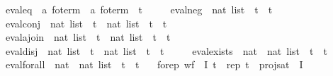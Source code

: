 \begin{isabellebody}
\ \ \ \ \ eval{\isacharunderscore}{\kern0pt}eq\ {\isacharcolon}{\kern0pt}{\isacharcolon}{\kern0pt}\ {\isachardoublequoteopen}{\isacharprime}{\kern0pt}a\ fo{\isacharunderscore}{\kern0pt}term\ {\isasymRightarrow}\ {\isacharprime}{\kern0pt}a\ fo{\isacharunderscore}{\kern0pt}term\ {\isasymRightarrow}\ {\isacharprime}{\kern0pt}t{\isachardoublequoteclose}\isanewline
\ \ \ \ \ eval{\isacharunderscore}{\kern0pt}neg\ {\isacharcolon}{\kern0pt}{\isacharcolon}{\kern0pt}\ {\isachardoublequoteopen}nat\ list\ {\isasymRightarrow}\ {\isacharprime}{\kern0pt}t\ {\isasymRightarrow}\ {\isacharprime}{\kern0pt}t{\isachardoublequoteclose}\isanewline
\ \ \ \ \ eval{\isacharunderscore}{\kern0pt}conj\ {\isacharcolon}{\kern0pt}{\isacharcolon}{\kern0pt}\ {\isachardoublequoteopen}nat\ list\ {\isasymRightarrow}\ {\isacharprime}{\kern0pt}t\ {\isasymRightarrow}\ nat\ list\ {\isasymRightarrow}\ {\isacharprime}{\kern0pt}t\ {\isasymRightarrow}\ {\isacharprime}{\kern0pt}t{\isachardoublequoteclose}\isanewline
\ \ \ \ \ eval{\isacharunderscore}{\kern0pt}ajoin\ {\isacharcolon}{\kern0pt}{\isacharcolon}{\kern0pt}\ {\isachardoublequoteopen}nat\ list\ {\isasymRightarrow}\ {\isacharprime}{\kern0pt}t\ {\isasymRightarrow}\ nat\ list\ {\isasymRightarrow}\ {\isacharprime}{\kern0pt}t\ {\isasymRightarrow}\ {\isacharprime}{\kern0pt}t{\isachardoublequoteclose}\isanewline
\ \ \ \ \ eval{\isacharunderscore}{\kern0pt}disj\ {\isacharcolon}{\kern0pt}{\isacharcolon}{\kern0pt}\ {\isachardoublequoteopen}nat\ list\ {\isasymRightarrow}\ {\isacharprime}{\kern0pt}t\ {\isasymRightarrow}\ nat\ list\ {\isasymRightarrow}\ {\isacharprime}{\kern0pt}t\ {\isasymRightarrow}\ {\isacharprime}{\kern0pt}t{\isachardoublequoteclose}\isanewline
\ \ \ \ \ eval{\isacharunderscore}{\kern0pt}exists\ {\isacharcolon}{\kern0pt}{\isacharcolon}{\kern0pt}\ {\isachardoublequoteopen}nat\ {\isasymRightarrow}\ nat\ list\ {\isasymRightarrow}\ {\isacharprime}{\kern0pt}t\ {\isasymRightarrow}\ {\isacharprime}{\kern0pt}t{\isachardoublequoteclose}\isanewline
\ \ \ \ \ eval{\isacharunderscore}{\kern0pt}forall\ {\isacharcolon}{\kern0pt}{\isacharcolon}{\kern0pt}\ {\isachardoublequoteopen}nat\ {\isasymRightarrow}\ nat\ list\ {\isasymRightarrow}\ {\isacharprime}{\kern0pt}t\ {\isasymRightarrow}\ {\isacharprime}{\kern0pt}t{\isachardoublequoteclose}\isanewline
\ \ \ fo{\isacharunderscore}{\kern0pt}rep{\isacharcolon}{\kern0pt}\ {\isachardoublequoteopen}wf\ {\isasymphi}\ I\ t\ {\isasymLongrightarrow}\ rep\ t\ {\isacharequal}{\kern0pt}\ proj{\isacharunderscore}{\kern0pt}sat\ {\isasymphi}\ I{\isachardoublequoteclose}\isanewline

\end{isabellebody}
